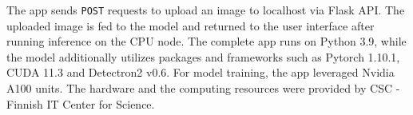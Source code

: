The app sends \texttt{POST} requests to upload an image to localhost via Flask API. The uploaded image is fed to the model and returned to the user interface after running inference on the CPU node. The complete app runs on Python 3.9, while the model additionally utilizes packages and frameworks such as Pytorch 1.10.1, CUDA 11.3 and Detectron2 v0.6. For model training, the app leveraged  Nvidia A100 units. The hardware and the computing resources were provided by CSC - Finnish IT Center for Science. 

\clearpage